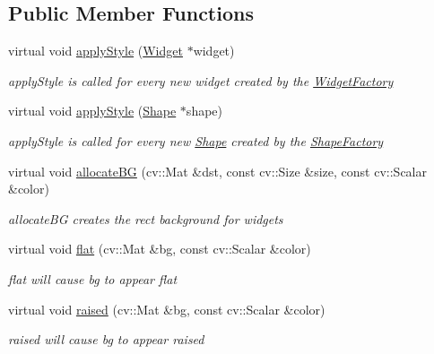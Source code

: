 \subsection*{Public Member Functions}
\begin{DoxyCompactItemize}
\item 
virtual void \hyperlink{classcanvascv_1_1TwoColoredTheme_a2a725588ca2e1c33900019622cc8fe9a}{apply\+Style} (\hyperlink{classcanvascv_1_1Widget}{Widget} $\ast$widget)
\begin{DoxyCompactList}\small\item\em apply\+Style is called for every new widget created by the \hyperlink{classcanvascv_1_1WidgetFactory}{Widget\+Factory} \end{DoxyCompactList}\item 
virtual void \hyperlink{classcanvascv_1_1TwoColoredTheme_ada225b2ed04e78caded01b23de343b1f}{apply\+Style} (\hyperlink{classcanvascv_1_1Shape}{Shape} $\ast$shape)
\begin{DoxyCompactList}\small\item\em apply\+Style is called for every new \hyperlink{classcanvascv_1_1Shape}{Shape} created by the \hyperlink{classcanvascv_1_1ShapeFactory}{Shape\+Factory} \end{DoxyCompactList}\item 
virtual void \hyperlink{classcanvascv_1_1TwoColoredTheme_ae085f9cd7f170e49fbc463348a4eb7b5}{allocate\+BG} (cv\+::\+Mat \&dst, const cv\+::\+Size \&size, const cv\+::\+Scalar \&color)
\begin{DoxyCompactList}\small\item\em allocate\+BG creates the rect background for widgets \end{DoxyCompactList}\item 
virtual void \hyperlink{classcanvascv_1_1TwoColoredTheme_a76c1d4f249bb5d01ff07b4559cbdd592}{flat} (cv\+::\+Mat \&bg, const cv\+::\+Scalar \&color)
\begin{DoxyCompactList}\small\item\em flat will cause bg to appear flat \end{DoxyCompactList}\item 
virtual void \hyperlink{classcanvascv_1_1TwoColoredTheme_a5c3d937a5e36e80eff6f7683f2898589}{raised} (cv\+::\+Mat \&bg, const cv\+::\+Scalar \&color)
\begin{DoxyCompactList}\small\item\em raised will cause bg to appear raised \end{DoxyCompactList}\item 

\end{DoxyCompactItemize}
